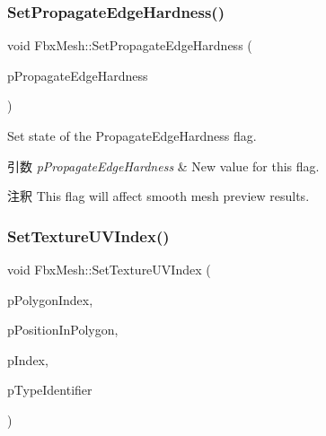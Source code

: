 \subsubsection{\texorpdfstring{Set\+Propagate\+Edge\+Hardness()}{SetPropagateEdgeHardness()}}
{\footnotesize\ttfamily void Fbx\+Mesh\+::\+Set\+Propagate\+Edge\+Hardness (\begin{DoxyParamCaption}\item[{bool}]{p\+Propagate\+Edge\+Hardness }\end{DoxyParamCaption})}

Set state of the Propagate\+Edge\+Hardness flag. 
\begin{DoxyParams}{引数}
{\em p\+Propagate\+Edge\+Hardness} & New value for this flag. \\
\hline
\end{DoxyParams}
\begin{DoxyRemark}{注釈}
This flag will affect smooth mesh preview results. 
\end{DoxyRemark}
\mbox{\label{class_fbx_mesh_a1e74780d575f601d6e28c52ff36b555d}} 
\subsubsection{\texorpdfstring{Set\+Texture\+U\+V\+Index()}{SetTextureUVIndex()}}
{\footnotesize\ttfamily void Fbx\+Mesh\+::\+Set\+Texture\+U\+V\+Index (\begin{DoxyParamCaption}\item[{int}]{p\+Polygon\+Index,  }\item[{int}]{p\+Position\+In\+Polygon,  }\item[{int}]{p\+Index,  }\item[{\hyperlink{class_fbx_layer_element_a8c95c5cd880b56c776acd379bd86f42c}{Fbx\+Layer\+Element\+::\+E\+Type}}]{p\+Type\+Identifier }\end{DoxyParamCaption})}

